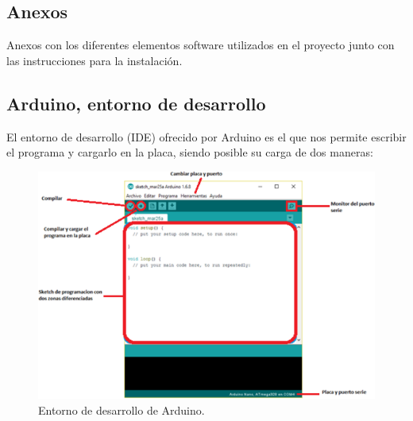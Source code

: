 

\newpage

\begin{appendix}
\backmatter

\chapter{Anexos}
\label{appendix:anexos}

Anexos con los diferentes elementos software utilizados en el proyecto junto con las instrucciones para la instalación.\\

\section{Arduino, entorno de desarrollo}

El entorno de desarrollo (IDE) ofrecido por Arduino es el que nos permite escribir el programa y cargarlo en la placa, siendo posible su carga de dos maneras:

\begin{figure}[H]
  \begin{center}
    \includegraphics[scale=0.5]{imagenes/entorno_desarrollo_arduino.png}
  \end{center}
  \label{fig:logo}
 \caption{Entorno de desarrollo de Arduino.}
\end{figure}


\end{appendix}
